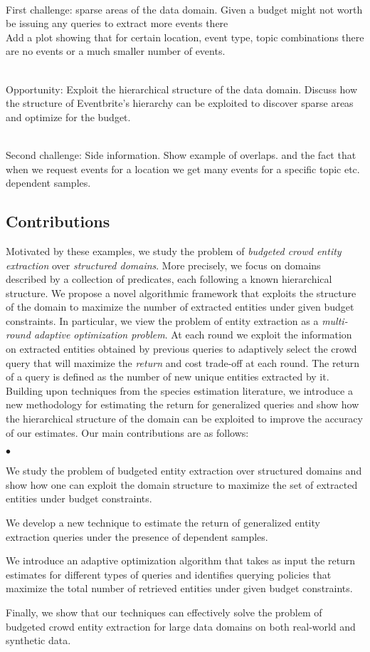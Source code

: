 \documentclass{sig-alternate}
\newcommand{\squishlist}{
   \begin{list}{$\bullet$}
    {
      \setlength{\itemsep}{0pt}
      \setlength{\parsep}{3pt}
      \setlength{\topsep}{3pt}
      \setlength{\partopsep}{0pt}
      \setlength{\leftmargin}{1.5em}
      \setlength{\labelwidth}{1em}
      \setlength{\labelsep}{0.5em} } }
\newcommand{\squishend}{
    \end{list}  }
\begin{document}
\ \\First challenge: sparse areas of the data domain. Given a budget might not worth be issuing any queries to extract more events there
\ \\Add a plot showing that for certain location, event type, topic combinations there are no events or a much smaller number of events. 

\ \\Opportunity: Exploit the hierarchical structure of the data domain. Discuss how the structure of Eventbrite's hierarchy can be exploited to discover sparse areas and optimize for the budget.

\ \\Second challenge: Side information. Show example of overlaps. and the fact that when we request events for a location we get many events for a specific topic etc. dependent samples.

\subsection{Contributions}
Motivated by these examples, we study the problem of {\em budgeted crowd entity extraction} over {\em structured domains}. More precisely, we focus on domains described by a collection of predicates, each following a known hierarchical structure. We propose a novel algorithmic framework that exploits the structure of the domain to maximize the number of extracted entities under given budget constraints. In particular, we view the problem of entity extraction as a {\em multi-round adaptive optimization problem}. At  each round we exploit the information on extracted entities obtained by previous queries to adaptively select the crowd query that will maximize the {\em return} and cost trade-off at each round. The return of a query is defined as the number of new unique entities extracted by it. Building upon techniques from the species estimation literature, we introduce a new methodology for estimating the return for generalized queries and show how the hierarchical structure of the domain can be exploited to improve the accuracy of our estimates. Our main contributions are as follows:

\squishlist
\item We study the problem of budgeted entity extraction over structured domains and show how one can exploit the domain structure to maximize the set of extracted entities under budget constraints. 
\item We develop a new technique to estimate the return of generalized entity extraction queries under the presence of dependent samples.
\item We introduce an adaptive optimization algorithm that takes as input the return estimates for different types of queries and identifies querying policies that maximize the total number of retrieved entities under given budget constraints. 
\item Finally, we show that our techniques can effectively solve the problem of budgeted crowd entity extraction for large data domains on both real-world and synthetic data.
\squishend
\end{document}
